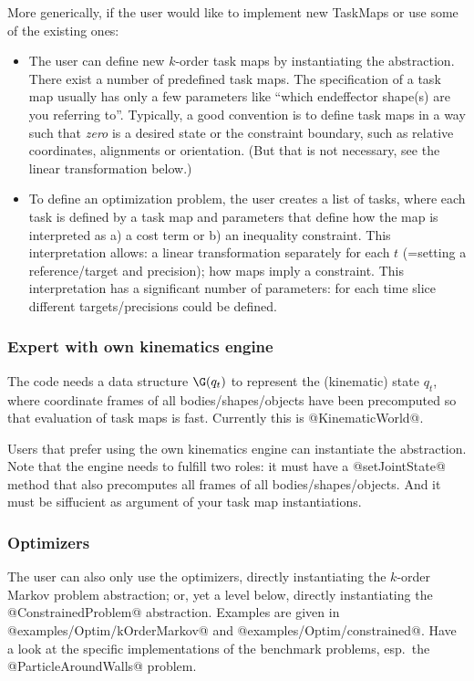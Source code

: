 \documentclass[10pt,fleqn,twoside]{article}
\begin{document}
{{More generically, if the user would like to implement new TaskMaps or
use some of the existing ones:
\begin{itemize}
\item The user can define new $k$-order task maps by instantiating the
abstraction. There exist a number of predefined task maps. The
specification of a task map usually has only a few parameters like
``which endeffector shape(s) are you referring to''. Typically, a good
convention is to define task maps in a way such that \emph{zero} is a
desired state or the constraint boundary, such as relative
coordinates, alignments or orientation. (But that is not necessary,
see the linear transformation below.)

\item To define an optimization problem, the user creates a list of
tasks, where each task is defined by a task map and parameters that
define how the map is interpreted as a) a cost term or b) an inequality
constraint. This interpretation allows: a linear
transformation separately for each $t$ (=setting a reference/target
and precision); how maps imply a constraint. This interpretation has a
significant number of parameters: for each time slice different
targets/precisions could be defined.
\end{itemize}


\subsubsection{Expert with own kinematics engine}

The code needs a data structure $\G(q_t)$ to represent the
(kinematic) state $q_t$, where coordinate frames of all
bodies/shapes/objects have been precomputed so that evaluation of task
maps is fast. Currently this is @KinematicWorld@.

Users that prefer using the own kinematics engine can instantiate the
abstraction. Note that the engine needs to fulfill two roles: it must
have a @setJointState@ method that also precomputes all frames of all
bodies/shapes/objects. And it must be siffucient as argument of your
task map instantiations.

\subsubsection{Optimizers}

The user can also only use the optimizers, directly instantiating the
$k$-order Markov problem abstraction; or, yet a level below, directly
instantiating the @ConstrainedProblem@ abstraction. Examples are given
in @examples/Optim/kOrderMarkov@ and
@examples/Optim/constrained@. Have a look at the specific
implementations of the benchmark problems, esp.\ the
@ParticleAroundWalls@ problem.

}}
\end{document}
